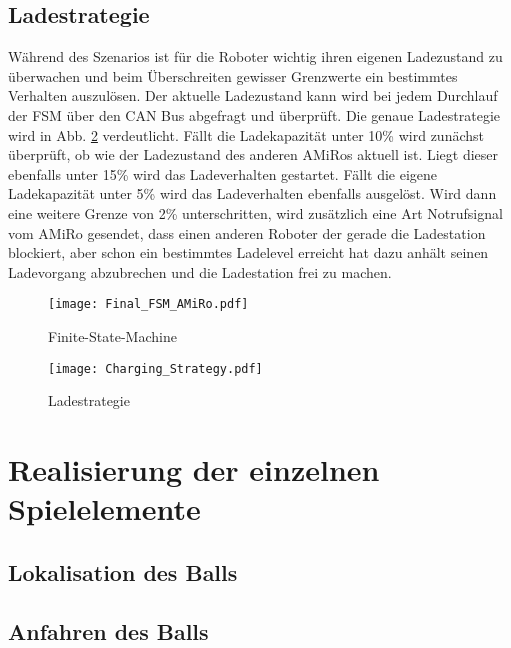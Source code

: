 \subsection{Ladestrategie} %
Während des Szenarios ist für die Roboter wichtig ihren eigenen Ladezustand zu überwachen und beim Überschreiten gewisser Grenzwerte ein bestimmtes Verhalten auszulösen. Der aktuelle Ladezustand kann wird bei jedem Durchlauf der FSM über den CAN Bus abgefragt und überprüft. Die genaue Ladestrategie wird in Abb. \ref{fig:charging-strategy} verdeutlicht. Fällt die Ladekapazität unter 10\%  wird zunächst überprüft, ob wie der Ladezustand des anderen AMiRos aktuell ist. Liegt dieser ebenfalls unter 15\% wird das Ladeverhalten gestartet. Fällt die eigene Ladekapazität unter 5\% wird das Ladeverhalten ebenfalls ausgelöst. Wird dann eine weitere Grenze von 2\% unterschritten, wird zusätzlich eine Art Notrufsignal vom AMiRo gesendet, dass einen anderen Roboter der gerade die Ladestation blockiert, aber schon ein bestimmtes Ladelevel erreicht hat dazu anhält seinen Ladevorgang abzubrechen und die Ladestation frei zu machen.

\begin{figure}[H]
	\begin{center}
		\texttt{[image: Final\_FSM\_AMiRo.pdf]} 	
		\caption{Finite-State-Machine}
		\label{fig:fsm-amiro}
	\end{center}
\end{figure}
\begin{figure}[H]
	\begin{center}
		\texttt{[image: Charging\_Strategy.pdf]} 	
		\caption{Ladestrategie}
		\label{fig:charging-strategy}
	\end{center}
\end{figure}

\section{Realisierung der einzelnen Spielelemente} %

\subsection{Lokalisation des Balls} %

\subsection{Anfahren des Balls} %

